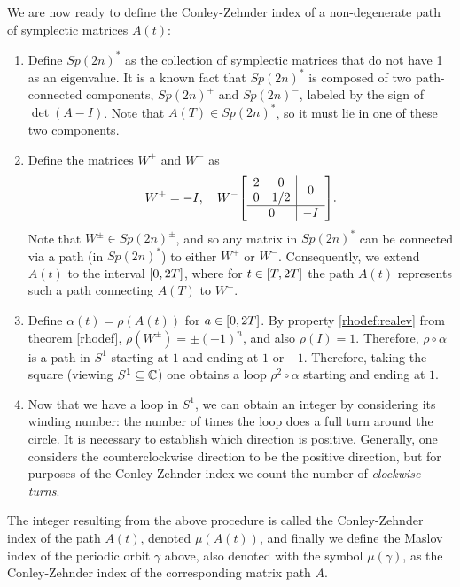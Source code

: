 We are now ready to define the Conley-Zehnder index of a non-degenerate path of symplectic matrices $A(t)$:
\begin{algorithm}
\begin{enumerate}[algorithm]
\item Define $Sp(2n)^*$ as the collection of symplectic matrices that do not have 1 as an eigenvalue. It is a known fact \cite[proposition~7.1.4]{audin} that $Sp(2n)^*$ is composed of two path-connected components, $Sp(2n)^+$ and $Sp(2n)^-$, labeled by the sign of $\det(A-I)$. Note that $A(T) \in Sp(2n)^*$, so it must lie in one of these two components.
\item\label{maslov:step2} Define the matrices $W^+$ and $W^-$ as
\begin{equation}
W^+ = - I, \quad W^- \mleft[\begin{array}{c|c}
\begin{matrix} 2 & 0 \\ 0 & 1/2 \end{matrix} & 0\\
\hline
0 & -I
\end{array}\mright].
\end{equation}
Note that $W^\pm \in Sp(2n)^\pm$, and so any matrix in $Sp(2n)^*$ can be connected via a path (in $Sp(2n)^*$) to either $W^+$ or $W^-$. Consequently, we extend $A(t)$ to the interval $\interval 0 {2T}$, where for $t \in \interval T {2T}$ the path $A(t)$ represents such a path connecting $A(T)$ to $W^\pm$.
\item Define $\alpha(t) = \rho(A(t))$ for $a \in \interval 0 {2T}$. By property \ref{rhodef:realev} from theorem \ref{rhodef}, $\rho(W^\pm) = \pm(-1)^n$, and also $\rho(I) = 1$. Therefore, $\rho \circ \alpha$ is a path in $S^1$ starting at $1$ and ending at $1$ or $-1$. Therefore, taking the square (viewing $S^1 \subseteq \mathbb{C}$) one obtains a loop $\rho^2 \circ \alpha$ starting and ending at $1$.
\item Now that we have a loop in $S^1$, we can obtain an integer by considering its winding number: the number of times the loop does a full turn around the circle. It is necessary to establish which direction is positive. Generally, one considers the counterclockwise direction to be the positive direction, but for purposes of the Conley-Zehnder index we count the number of \emph{clockwise turns}.
\end{enumerate}
\end{algorithm}
The integer resulting from the above procedure is called the Conley-Zehnder index of the path $A(t)$, denoted $\mu(A(t))$, and finally we define the Maslov index of the periodic orbit $\gamma$ above, also denoted with the symbol $\mu(\gamma)$, as the Conley-Zehnder index of the corresponding matrix path $A$.

